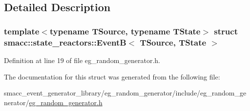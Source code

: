 \subsection{Detailed Description}
\subsubsection*{template$<$typename T\+Source, typename T\+State$>$\newline
struct smacc\+::state\+\_\+reactors\+::\+Event\+B$<$ T\+Source, T\+State $>$}



Definition at line 19 of file eg\+\_\+random\+\_\+generator.\+h.



The documentation for this struct was generated from the following file\+:\begin{DoxyCompactItemize}
\item 
smacc\+\_\+event\+\_\+generator\+\_\+library/eg\+\_\+random\+\_\+generator/include/eg\+\_\+random\+\_\+generator/\hyperlink{eg__random__generator_8h}{eg\+\_\+random\+\_\+generator.\+h}\end{DoxyCompactItemize}
